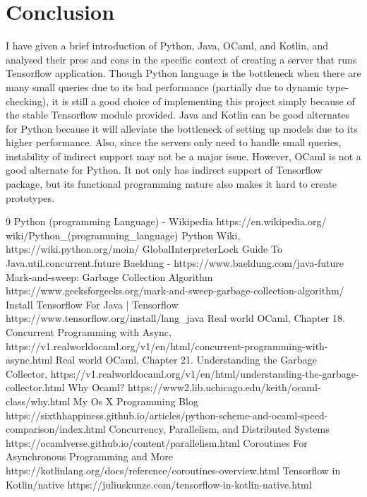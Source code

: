 \documentclass[letterpaper,twocolumn,10pt]{article}
\begin{document}
\section{Conclusion}
I have given a brief introduction of Python, Java, OCaml, and Kotlin, and analysed their pros and cons in the specific context of creating a server that runs Tensorflow application. Though Python language is the bottleneck when there are many small queries due to its bad performance (partially due to dynamic type-checking), it is still a good choice of implementing this project simply because of the stable Tensorflow module provided. Java and Kotlin can be good alternates for Python because it will alleviate the bottleneck of setting up models due to its higher performance. Also, since the servers only need to handle small queries, instability of indirect support may not be a major issue. However, OCaml is not a good alternate for Python. It not only has indirect support of Tensorflow package, but its functional programming nature also makes it hard to create prototypes.

\begin{thebibliography} {9}
\bibitem{}
Python (programming Language) - Wikipedia
https://en.wikipedia.org/
wiki/Python\_(programming\_language)
\bibitem{}
Python Wiki,
https://wiki.python.org/moin/
GlobalInterpreterLock
\bibitem{}
Guide To Java.util.concurrent.future
Baeldung - https://www.baeldung.com/java-future
\bibitem{}
Mark-and-sweep: Garbage Collection Algorithm
https://www.geeksforgeeks.org/mark-and-sweep-garbage-collection-algorithm/
\bibitem{}
Install Tensorflow For Java | Tensorflow
https://www.tensorflow.org/install/lang\_java
\bibitem{}
Real world OCaml,
Chapter 18. Concurrent Programming with Async,
https://v1.realworldocaml.org/v1/en/html/concurrent-programming-with-async.html
\bibitem{}
Real world OCaml,
Chapter 21. Understanding the Garbage Collector,
https://v1.realworldocaml.org/v1/en/html/understanding-the-garbage-collector.html
\bibitem{}
Why Ocaml?
https://www2.lib.uchicago.edu/keith/ocaml-class/why.html
\bibitem{}
My Os X Programming Blog
https://sixthhappiness.github.io/articles/python-scheme-and-ocaml-speed-comparison/index.html
\bibitem{}
Concurrency, Parallelism, and Distributed Systems
https://ocamlverse.github.io/content/parallelism.html
\bibitem{}
Coroutines For Asynchronous Programming and More
https://kotlinlang.org/docs/reference/coroutines-overview.html
\bibitem{}
Tensorflow in Kotlin/native
https://juliuskunze.com/tensorflow-in-kotlin-native.html
\end{thebibliography}

\end{document}
